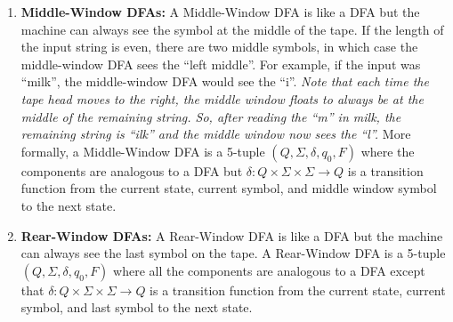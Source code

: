 \documentclass[12pt]{article}
\begin{document}
\begin{enumerate}

	\item \textbf{Middle-Window DFAs:}  A Middle-Window DFA is like a DFA but the machine can always see the symbol at the middle of the tape.  If the length of the input string is even, there are two middle symbols, in which case the middle-window DFA sees the ``left middle''.  For example, if the input was ``milk'', the middle-window DFA would see the ``i''.  \emph{Note that each time the tape head moves to the right, the middle window floats to always be at the middle of the remaining string.  So, after reading the ``m'' in milk, the remaining string is ``ilk'' and the middle window now sees the ``l''.}  More formally, a Middle-Window DFA is a 5-tuple $(Q, \Sigma, \delta, q_0, F)$ where the components are analogous to a DFA but $\delta: Q \times \Sigma \times \Sigma \rightarrow Q$ is a transition function from the current state, current symbol, and middle window symbol to the next state.
	
	\item \textbf{Rear-Window DFAs:}  A Rear-Window DFA is like a DFA but the machine can always see the last symbol on the tape. A  Rear-Window DFA is a 
	5-tuple $(Q, \Sigma, \delta, q_0, F)$ where all the components are analogous to a DFA except that $\delta:  Q \times \Sigma \times \Sigma \rightarrow Q$ is a transition function from the current state, current symbol, and last symbol to the next state.
		
\end{enumerate}
\end{document}

